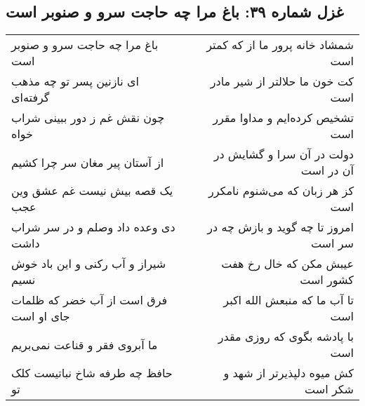 \begin{center}
\section*{غزل شماره ۳۹: باغ مرا چه حاجت سرو و صنوبر است}
\label{sec:sh039}
\begin{longtable}{l p{0.5cm} r}
باغ مرا چه حاجت سرو و صنوبر است
&&
شمشاد خانه پرور ما از که کمتر است
\\
ای نازنین پسر تو چه مذهب گرفته‌ای
&&
کت خون ما حلالتر از شیر مادر است
\\
چون نقش غم ز دور ببینی شراب خواه
&&
تشخیص کرده‌ایم و مداوا مقرر است
\\
از آستان پیر مغان سر چرا کشیم
&&
دولت در آن سرا و گشایش در آن در است
\\
یک قصه بیش نیست غم عشق وین عجب
&&
کز هر زبان که می‌شنوم نامکرر است
\\
دی وعده داد وصلم و در سر شراب داشت
&&
امروز تا چه گوید و بازش چه در سر است
\\
شیراز و آب رکنی و این باد خوش نسیم
&&
عیبش مکن که خال رخ هفت کشور است
\\
فرق است از آب خضر که ظلمات جای او است
&&
تا آب ما که منبعش الله اکبر است
\\
ما آبروی فقر و قناعت نمی‌بریم
&&
با پادشه بگوی که روزی مقدر است
\\
حافظ چه طرفه شاخ نباتیست کلک تو
&&
کش میوه دلپذیرتر از شهد و شکر است
\\
\end{longtable}
\end{center}
